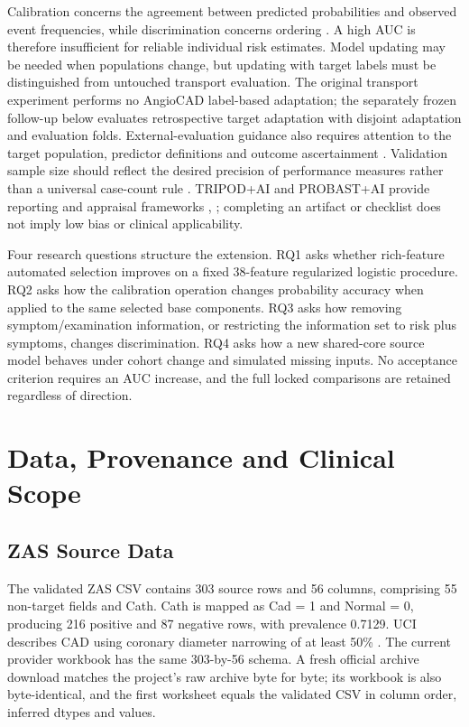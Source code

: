 \documentclass[conference]{IEEEtran}
\begin{document}
Calibration concerns the agreement between predicted probabilities and observed event frequencies, while discrimination concerns ordering \cite{r5}. A high AUC is therefore insufficient for reliable individual risk estimates. Model updating may be needed when populations change, but updating with target labels must be distinguished from untouched transport evaluation. The original transport experiment performs no AngioCAD label-based adaptation; the separately frozen follow-up below evaluates retrospective target adaptation with disjoint adaptation and evaluation folds. External-evaluation guidance also requires attention to the target population, predictor definitions and outcome ascertainment \cite{r8}. Validation sample size should reflect the desired precision of performance measures rather than a universal case-count rule \cite{r9}. TRIPOD+AI and PROBAST+AI provide reporting and appraisal frameworks \cite{r6}, \cite{r7}; completing an artifact or checklist does not imply low bias or clinical applicability.

Four research questions structure the extension. RQ1 asks whether rich-feature automated selection improves on a fixed 38-feature regularized logistic procedure. RQ2 asks how the calibration operation changes probability accuracy when applied to the same selected base components. RQ3 asks how removing symptom/examination information, or restricting the information set to risk plus symptoms, changes discrimination. RQ4 asks how a new shared-core source model behaves under cohort change and simulated missing inputs. No acceptance criterion requires an AUC increase, and the full locked comparisons are retained regardless of direction.

\section{Data, Provenance and Clinical Scope}
\subsection{ZAS Source Data}
The validated ZAS CSV contains 303 source rows and 56 columns, comprising 55 non-target fields and Cath. Cath is mapped as Cad = 1 and Normal = 0, producing 216 positive and 87 negative rows, with prevalence 0.7129. UCI describes CAD using coronary diameter narrowing of at least 50\% \cite{r3}. The current provider workbook has the same 303-by-56 schema. A fresh official archive download matches the project's raw archive byte for byte; its workbook is also byte-identical, and the first worksheet equals the validated CSV in column order, inferred dtypes and values.
\end{document}
